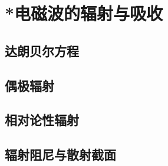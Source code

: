 

\section{*电磁波的辐射与吸收}\label{20-3}

\subsection{达朗贝尔方程}\label{20-3-1}

\subsection{偶极辐射}\label{20-3-2}

\subsection{相对论性辐射}\label{20-3-3}

\subsection{辐射阻尼与散射截面}\label{20-3-4}